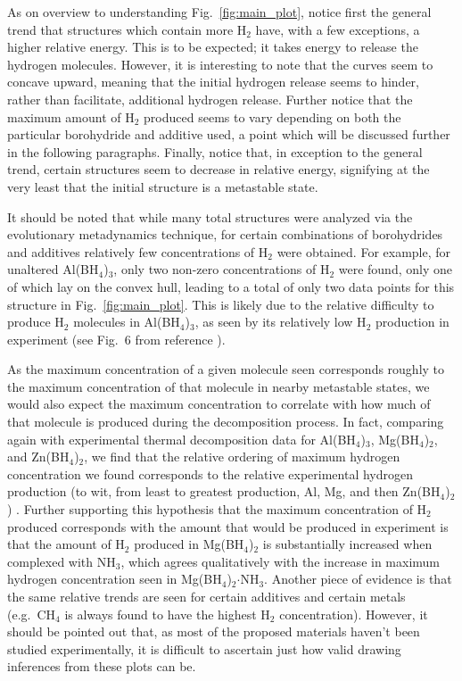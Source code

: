 \documentclass[twocolumn, prb, showpacs]{revtex4-1}
\begin{document}
As on overview to understanding Fig.~\ref{fig:main_plot}, notice first the general trend that structures
which contain more H$_2$ have, with a few exceptions, a higher relative energy. This is to be expected; it takes
energy to release the hydrogen molecules. However, it is interesting to note that the curves seem to concave upward, meaning
that the initial hydrogen release seems to hinder, rather than facilitate, additional hydrogen release.
Further notice that the maximum amount of H$_2$ produced seems to vary depending on both the 
particular borohydride and additive used, a point which will be discussed further in the following paragraphs. Finally, notice that,
in exception to the general trend, certain structures seem to decrease in relative energy, signifying at the very least
that the initial structure is a metastable state.

It should be noted that while many total structures were analyzed via
the evolutionary metadynamics technique, for certain combinations of
borohydrides and additives relatively few concentrations of H$_2$ were
obtained.  For example, for unaltered Al(BH$_4$)$_3$, only two non-zero
concentrations of H$_2$ were found, only one of which lay on the convex hull,
leading to a total of only two data points for this structure in
Fig.~\ref{fig:main_plot}.  This is likely due to the relative difficulty to
produce H$_2$ molecules in Al(BH$_4$)$_3$, as seen by its relatively low H$_2$
production in experiment (see Fig.~6 from reference \cite{Nakamori_2007:thermodynamical_stabilities}).

As the maximum concentration of a given molecule seen corresponds roughly to
the maximum concentration of that molecule in nearby metastable states, we
would also expect the maximum concentration to correlate with how much of that
molecule is produced during the decomposition process.  In fact, comparing
again with experimental thermal decomposition data for Al(BH$_4$)$_3$,
Mg(BH$_4$)$_2$, and Zn(BH$_4$)$_2$, we find that the relative ordering of
maximum hydrogen concentration we found corresponds to the relative experimental
hydrogen production (to wit, from least to greatest production, Al, Mg, and
then Zn(BH$_4$)$_2$) \cite{Nakamori_2006:correlation_between, Nakamori_2007:thermodynamical_stabilities}. Further
supporting this hypothesis that the maximum concentration of H$_2$ produced
corresponds with the amount that would be produced in experiment is that the
amount of H$_2$ produced in Mg(BH$_4$)$_2$ is substantially increased when
complexed with
NH$_3$\cite{Soloveichik_2008:ammine_magnesium}, which
agrees qualitatively with the increase in maximum hydrogen concentration seen
in Mg(BH$_4$)$_2$$\cdot$NH$_3$. Another piece of evidence is that the same relative
trends are seen for certain additives and certain metals (e.g.\ CH$_4$ is
always found to have the highest H$_2$ concentration).  However, it should be
pointed out that, as most of the proposed materials haven't been studied
experimentally, it is difficult to ascertain just how valid drawing inferences
from these plots can be.
\end{document}
